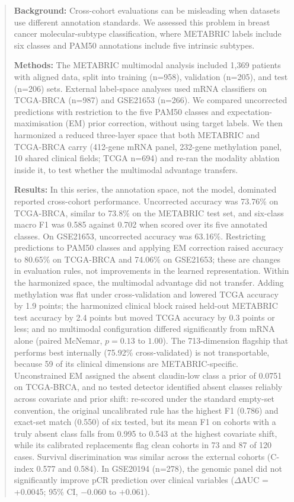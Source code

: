 \documentclass[11pt,a4paper]{article}
\begin{document}
\begin{abstract}
\noindent
\textbf{Background:} Cross-cohort evaluations can be misleading when datasets use different annotation standards. We assessed this problem in breast cancer molecular-subtype classification, where METABRIC labels include six classes and PAM50 annotations include five intrinsic subtypes.

\textbf{Methods:} The METABRIC multimodal analysis included 1,369 patients with aligned data, split into training (n=958), validation (n=205), and test (n=206) sets. External label-space analyses used mRNA classifiers on TCGA-BRCA (n=987) and GSE21653 (n=266). We compared uncorrected predictions with restriction to the five PAM50 classes and expectation-maximisation (EM) prior correction, without using target labels. We then harmonized a reduced three-layer space that both METABRIC and TCGA-BRCA carry (412-gene mRNA panel, 232-gene methylation panel, 10 shared clinical fields; TCGA n=694) and re-ran the modality ablation inside it, to test whether the multimodal advantage transfers.

\textbf{Results:} In this series, the annotation space, not the model, dominated reported cross-cohort performance. Uncorrected accuracy was 73.76\% on TCGA-BRCA, similar to 73.8\% on the METABRIC test set, and six-class macro F1 was 0.585 against 0.702 when scored over its five annotated classes. On GSE21653, uncorrected accuracy was 63.16\%. Restricting predictions to PAM50 classes and applying EM correction raised accuracy to 80.65\% on TCGA-BRCA and 74.06\% on GSE21653; these are changes in evaluation rules, not improvements in the learned representation. Within the harmonized space, the multimodal advantage did not transfer. Adding methylation was flat under cross-validation and lowered TCGA accuracy by 1.9 points; the harmonized clinical block raised held-out METABRIC test accuracy by 2.4 points but moved TCGA accuracy by 0.3 points or less; and no multimodal configuration differed significantly from mRNA alone (paired McNemar, $p=0.13$ to $1.00$). The 713-dimension flagship that performs best internally (75.92\% cross-validated) is not transportable, because 59 of its clinical dimensions are METABRIC-specific. Unconstrained EM assigned the absent claudin-low class a prior of 0.0751 on TCGA-BRCA, and no tested detector identified absent classes reliably across covariate and prior shift: re-scored under the standard empty-set convention, the original uncalibrated rule has the highest F1 (0.786) and exact-set match (0.550) of six tested, but its mean F1 on cohorts with a truly absent class falls from 0.995 to 0.543 at the highest covariate shift, while its calibrated replacements flag clean cohorts in 73 and 87 of 120 cases. Survival discrimination was similar across the external cohorts (C-index 0.577 and 0.584). In GSE20194 (n=278), the genomic panel did not significantly improve pCR prediction over clinical variables ($\Delta$AUC = +0.0045; 95\% CI, $-0.060$ to $+0.061$).


\end{abstract}
\end{document}
